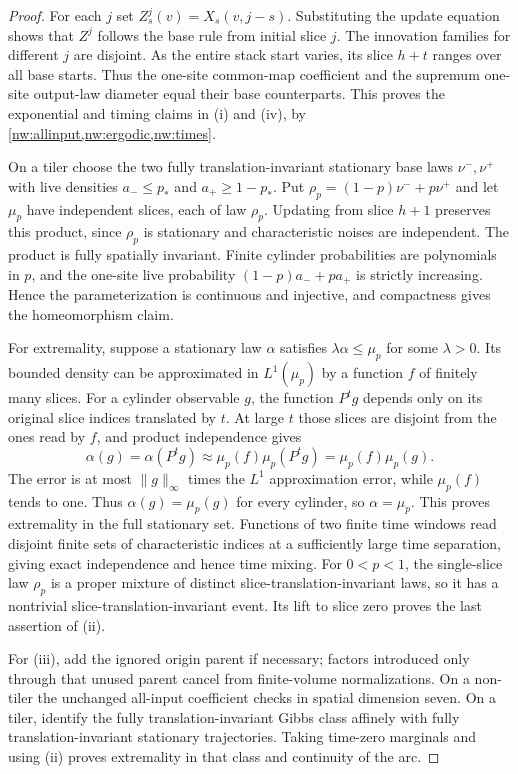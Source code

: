 \begin{proof}
For each $j$ set $Z_s^j(v)=X_s(v,j-s)$. Substituting the update equation shows that $Z^j$ follows the base rule from initial slice $j$. The innovation families for different $j$ are disjoint. As the entire stack start varies, its slice $h+t$ ranges over all base starts. Thus the one-site common-map coefficient and the supremum one-site output-law diameter equal their base counterparts. This proves the exponential and timing claims in (i) and (iv), by \cref{nw:allinput,nw:ergodic,nw:times}.

On a tiler choose the two fully translation-invariant stationary base laws $\nu^-,\nu^+$ with live densities $a_-\le p_*$ and $a_+\ge1-p_*$. Put $\rho_p=(1-p)\nu^-+p\nu^+$ and let $\mu_p$ have independent slices, each of law $\rho_p$. Updating from slice $h+1$ preserves this product, since $\rho_p$ is stationary and characteristic noises are independent. The product is fully spatially invariant. Finite cylinder probabilities are polynomials in $p$, and the one-site live probability $(1-p)a_-+pa_+$ is strictly increasing. Hence the parameterization is continuous and injective, and compactness gives the homeomorphism claim.

For extremality, suppose a stationary law $\alpha$ satisfies $\lambda\alpha\le\mu_p$ for some $\lambda>0$. Its bounded density can be approximated in $L^1(\mu_p)$ by a function $f$ of finitely many slices. For a cylinder observable $g$, the function $P^tg$ depends only on its original slice indices translated by $t$. At large $t$ those slices are disjoint from the ones read by $f$, and product independence gives
\[
 \alpha(g)=\alpha(P^tg)
 \approx\mu_p(f)\mu_p(P^tg)=\mu_p(f)\mu_p(g).
\]
The error is at most $\|g\|_\infty$ times the $L^1$ approximation error, while $\mu_p(f)$ tends to one. Thus $\alpha(g)=\mu_p(g)$ for every cylinder, so $\alpha=\mu_p$. This proves extremality in the full stationary set. Functions of two finite time windows read disjoint finite sets of characteristic indices at a sufficiently large time separation, giving exact independence and hence time mixing. For $0<p<1$, the single-slice law $\rho_p$ is a proper mixture of distinct slice-translation-invariant laws, so it has a nontrivial slice-translation-invariant event. Its lift to slice zero proves the last assertion of (ii).

For (iii), add the ignored origin parent if necessary; factors introduced only through that unused parent cancel from finite-volume normalizations. On a non-tiler the unchanged all-input coefficient checks \cite[Corollary~13.7]{DM26} in spatial dimension seven. On a tiler, \cite[Lemma~2.4 and Corollary~10.4]{DM26} identify the fully translation-invariant Gibbs class affinely with fully translation-invariant stationary trajectories. Taking time-zero marginals and using (ii) proves extremality in that class and continuity of the arc.


\end{proof}
